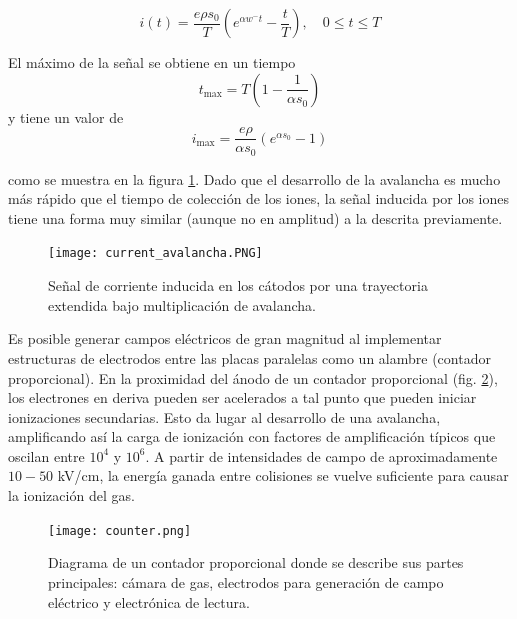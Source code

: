 \documentclass{article}
\begin{document}
\begin{equation}
i(t) = \frac{e \rho s_0}{T} \left( e^{\alpha w^- t} - \frac{t}{T} \right), \quad 0 \leq t \leq T
\end{equation}

El máximo de la señal se obtiene en un tiempo 
\begin{equation}
t_{\text{max}} = T \left( 1 - \frac{1}{\alpha s_0} \right)
\end{equation}
y tiene un valor de 
\begin{equation}
i_{\text{max}} = \frac{e \rho}{\alpha s_0} \left( e^{\alpha s_0} - 1 \right)
\end{equation}

\noindent como se muestra en la figura \ref{fig:current_avalancha}. Dado que el desarrollo de la avalancha es mucho más rápido que el tiempo de colección de los iones, la señal inducida por los iones tiene una forma muy similar (aunque no en amplitud) a la descrita previamente.

\begin{figure}[H]
    \centering
    \texttt{[image: current\_avalancha.PNG]}
    \caption{Señal de corriente inducida en los cátodos por una trayectoria extendida bajo multiplicación de avalancha.}
    \label{fig:current_avalancha}
\end{figure}

\noindent Es posible generar campos eléctricos de gran magnitud al implementar estructuras de electrodos entre las placas paralelas como un alambre (contador proporcional). En la proximidad del ánodo de un contador proporcional (fig. \ref{fig:counter}), los electrones en deriva pueden ser acelerados a tal punto que pueden iniciar ionizaciones secundarias. Esto da lugar al desarrollo de una avalancha, amplificando así la carga de ionización con factores de amplificación típicos que oscilan entre \(10^4\) y \(10^6\). A partir de intensidades de campo de aproximadamente \(10-50\) kV/cm, la energía ganada entre colisiones se vuelve suficiente para causar la ionización del gas.\\

\begin{figure}[H]
    \centering
    \texttt{[image: counter.png]}
    \caption{Diagrama de un contador proporcional donde se describe sus partes principales: cámara de gas, electrodos para generación de campo eléctrico y electrónica de lectura.}
    \label{fig:counter}
\end{figure}
\end{document}
